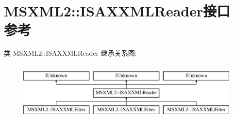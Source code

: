 \hypertarget{interface_m_s_x_m_l2_1_1_i_s_a_x_x_m_l_reader}{}\section{M\+S\+X\+M\+L2\+:\+:I\+S\+A\+X\+X\+M\+L\+Reader接口 参考}
\label{interface_m_s_x_m_l2_1_1_i_s_a_x_x_m_l_reader}
类 M\+S\+X\+M\+L2\+:\+:I\+S\+A\+X\+X\+M\+L\+Reader 继承关系图\+:\begin{figure}[H]
\begin{center}
\leavevmode
\includegraphics[height=3.000000cm]{interface_m_s_x_m_l2_1_1_i_s_a_x_x_m_l_reader}
\end{center}
\end{figure}
